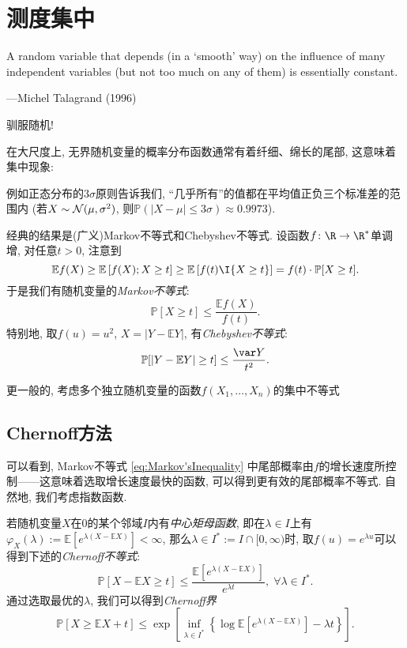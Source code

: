 \section{测度集中}

\epigraph{A random variable that depends (in a ‘smooth’ way) on the influence of many independent variables (but not too much on any of them) is essentially constant.}{---Michel Talagrand (1996)}

驯服随机! 

在大尺度上, 无界随机变量的概率分布函数通常有着纤细、绵长的尾部, 这意味着集中现象: 

例如正态分布的$3 \sigma$原则告诉我们, “几乎所有”的值都在平均值正负三个标准差的范围内 (若$X \sim \mathcal{N}(\mu, \sigma^2)$, 则$\mathbb{P}(|X - \mu| \leq 3 \sigma) \approx 0.9973$). 

经典的结果是(广义)Markov不等式和Chebyshev不等式.
设函数$f \colon \R \to \R^*$单调增, 对任意$t > 0$, 注意到
\begin{equation*}
	\mathbb{E}f(X) 
		\geq \mathbb{E}\left[f(X); X \geq t \right]
		\geq \mathbb{E}\left[f(t) \I{X \geq t} \right] 
		= f(t) \cdot \mathbb{P}[X \geq t].
\end{equation*}
于是我们有随机变量的\emph{Markov不等式}: 
\begin{equation}\label{eq:Markov'sInequality}
	\mathbb{P}[X \geq t] \leq \frac{\mathbb{E}f(X)}{f(t)}.
\end{equation}
特别地, 取$f(u) = u^2$, $X = |Y - \mathbb{E}Y|$, 有\emph{Chebyshev不等式}: 
\begin{equation*}
	\mathbb{P}[|Y - \mathbb{E}Y| \geq t] 
	\leq \frac{\var Y}{t^2}.
\end{equation*}

更一般的, 考虑多个独立随机变量的函数$f(X_1, \dots, X_n)$的集中不等式


\subsection{Chernoff方法}

可以看到, Markov不等式 \eqref{eq:Markov'sInequality} 中尾部概率由$f$的增长速度所控制——这意味着选取增长速度最快的函数, 可以得到更有效的尾部概率不等式. 
自然地, 我们考虑指数函数. 

若随机变量$X$在$0$的某个邻域$I$内有\emph{中心矩母函数}, 即在$\lambda \in I$上有$\varphi_X(\lambda) := \mathbb{E}[e^{\lambda (X - \mathbb{E}X)}] < \infty$, 那么$\lambda \in I^* := I \cap [0, \infty)$时, 取$f(u) = e^{\lambda u}$可以得到下述的\emph{Chernoff不等式}: 
\begin{equation*}
	\mathbb{P}[X - \mathbb{E}X \geq t] 
	\leq \frac{\mathbb{E}[e^{\lambda(X - \mathbb{E}X)}]}{e^{\lambda t}},\;
	\forall \lambda \in I^*.
\end{equation*}
通过选取最优的$\lambda$, 我们可以得到\emph{Chernoff界}
\begin{equation*}
	\mathbb{P}[X \geq \mathbb{E}X + t]
	\leq \exp \left[ \inf_{\lambda \in I^*} \left\{ \log \mathbb{E}[e^{\lambda(X - \mathbb{E}X)}] - \lambda t \right\} \right]. 
\end{equation*}

